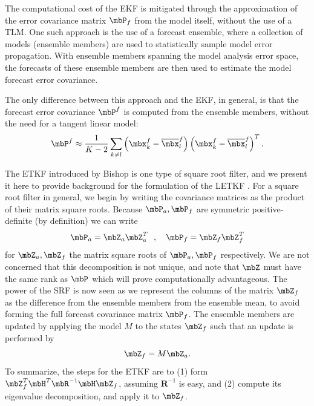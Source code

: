 The computational cost of the EKF is mitigated through the approximation of the error covariance matrix $\mbP_f$ from the model itself, without the use of a TLM.
One such approach is the use of a forecast ensemble, where a collection of models (ensemble members) are used to statistically sample model error propagation.
With ensemble members spanning the model analysis error space, the forecasts of these ensemble members are then used to estimate the model forecast error covariance.

The only difference between this approach and the EKF, in general, is that the forecast error covariance $\mbP^f$ is computed from the ensemble members, without the need for a tangent linear model:
\[ \mbP^f \approx \frac{1}{K-2} \sum _{k\neq l} \left ( \mbx_k ^f - \overline{\mbx} ^f _l \right ) \left (\mbx_k ^f - \overline{\mbx} ^f _l \right ) ^T .\]

The ETKF introduced by Bishop is one type of square root filter, and we present it here to provide background for the formulation of the LETKF \cite{bishop2001adaptive}.
For a square root filter in general, we begin by writing the covariance matrices as the product of their matrix square roots.
Because $\mbP_a,\mbP_f$ are symmetric positive-definite (by definition) we can write
\begin{equation} \mbP_a = \mbZ_a \mbZ_a^T ~~,~~~ \mbP_f = \mbZ_f \mbZ_f^T \end{equation}
for $\mbZ_a,\mbZ_f$ the matrix square roots of $\mbP_a,\mbP_f$ respectively.
We are not concerned that this decomposition is not unique, and note that $\mbZ$ must have the same rank as $\mbP$ which will prove computationally advantageous.
The power of the SRF is now seen as we represent the columns of the matrix $\mbZ_f$ as the difference from the ensemble members from the ensemble mean, to avoid forming the full forecast covariance matrix $\mbP_f$.
The ensemble members are updated by applying the model $M$ to the states $\mbZ_f$ such that an update is performed by
\begin{equation} \mbZ_f = M \mbZ_a .\end{equation}
To summarize, the steps for the ETKF are to (1) form $\mbZ_f^T\mbH^T\mbR^{-1}\mbH\mbZ_f$, assuming $\mathbf{R}^{-1}$ is easy, and (2) compute its eigenvalue decomposition, and apply it to $\mbZ_f$.

